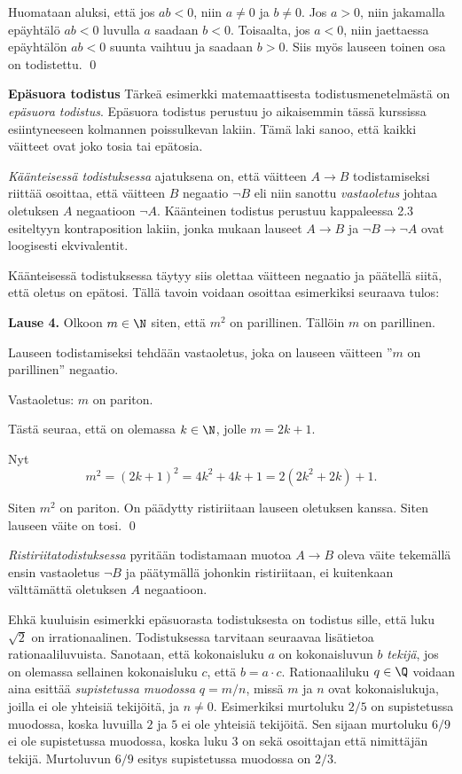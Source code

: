 Huomataan aluksi, että jos $ab<0$, niin $a\neq 0$ ja $b\neq 0$. Jos $a>0$, niin jakamalla epäyhtälö $ab<0$ luvulla $a$ saadaan $b<0$. Toisaalta, jos $a<0$, niin jaettaessa epäyhtälön $ab<0$ suunta vaihtuu ja saadaan $b>0$. Siis myös lauseen toinen osa on todistettu.
\qed

{\bf Epäsuora todistus}
Tärkeä esimerkki matemaattisesta todistusmenetelmästä on {\em epäsuora todistus}. Epäsuora todistus perustuu jo aikaisemmin tässä kurssissa esiintyneeseen kolmannen poissulkevan lakiin. Tämä laki sanoo, että kaikki väitteet ovat joko tosia tai epätosia.

{\em Käänteisessä todistuksessa} ajatuksena on, että väitteen $A\to B$ todistamiseksi riittää osoittaa, että väitteen $B$ negaatio $\lnot B$ eli niin sanottu {\em vastaoletus} johtaa oletuksen $A$ negaatioon $\lnot A$. Käänteinen todistus perustuu kappaleessa 2.3 esiteltyyn kontraposition lakiin, jonka mukaan lauseet $A\to B$ ja $\lnot B \to \lnot A$ ovat loogisesti ekvivalentit. 

Käänteisessä todistuksessa täytyy siis olettaa väitteen negaatio ja päätellä siitä, että oletus on epätosi. Tällä tavoin voidaan osoittaa esimerkiksi seuraava tulos:

{\bf Lause 4.} Olkoon $m\in \N$ siten, että $m^2$ on parillinen. Tällöin $m$ on parillinen.

\proof
Lauseen todistamiseksi tehdään vastaoletus, joka on lauseen väitteen ''$m$ on parillinen'' negaatio.

Vastaoletus: $m$ on pariton.

Tästä seuraa, että on olemassa $k\in \N$, jolle $m=2k+1$.

Nyt
\[
m^2 = (2k+1)^2 = 4k^2+4k+1 = 2(2k^2+2k)+1.
\]

Siten $m^2$ on pariton. On päädytty ristiriitaan lauseen oletuksen kanssa. Siten lauseen väite on tosi.
\qed

{\em Ristiriitatodistuksessa} pyritään todistamaan muotoa $A\to B$ oleva väite tekemällä ensin vastaoletus $\lnot B$ ja päätymällä johonkin ristiriitaan, ei kuitenkaan välttämättä oletuksen $A$ negaatioon.

Ehkä kuuluisin esimerkki epäsuorasta todistuksesta on todistus sille, että luku $\sqrt{2}$ on irrationaalinen. Todistuksessa tarvitaan seuraavaa lisätietoa rationaaliluvuista. Sanotaan, että kokonaisluku $a$ on kokonaisluvun $b$ {\em tekijä}, jos on olemassa sellainen kokonaisluku $c$, että $b=a\cdot c$. Rationaaliluku $q\in\Q$ voidaan aina esittää {\em supistetussa muodossa} $q=m/n$, missä $m$ ja $n$ ovat kokonaislukuja, joilla ei ole yhteisiä tekijöitä, ja $n\neq 0$. Esimerkiksi murtoluku $2/5$ on supistetussa muodossa, koska luvuilla $2$ ja $5$ ei ole yhteisiä tekijöitä. Sen sijaan murtoluku $6/9$ ei ole supistetussa muodossa, koska luku $3$ on sekä osoittajan että nimittäjän tekijä. Murtoluvun $6/9$ esitys supistetussa muodossa on $2/3$.

